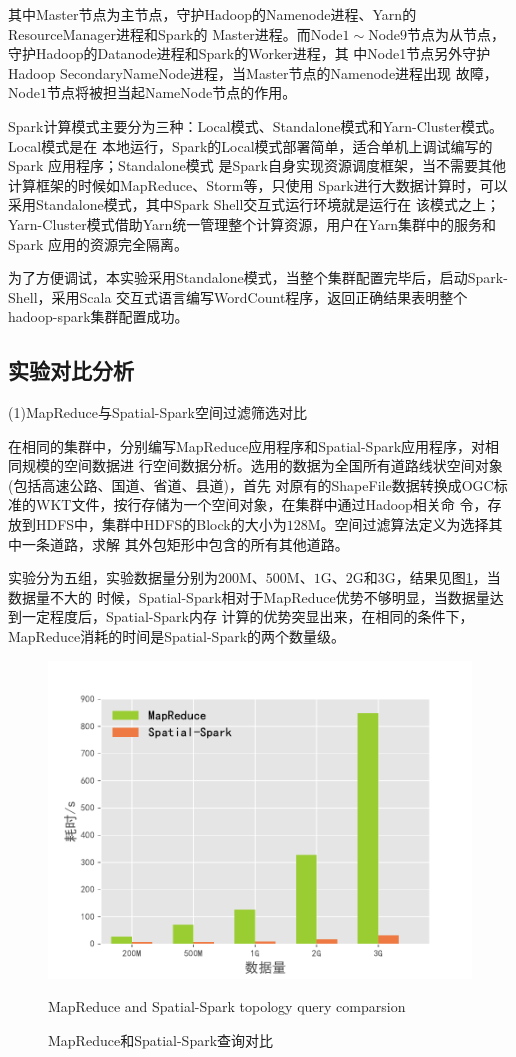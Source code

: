 其中Master节点为主节点，守护Hadoop的Namenode进程、Yarn的ResourceManager进程和Spark的
Master进程。而Node$1\sim $Node$9$节点为从节点，守护Hadoop的Datanode进程和Spark的Worker进程，其
中Node1节点另外守护Hadoop SecondaryNameNode进程，当Master节点的Namenode进程出现
故障，Node$1$节点将被担当起NameNode节点的作用。

Spark计算模式主要分为三种：Local模式、Standalone模式和Yarn-Cluster模式。Local模式是在
本地运行，Spark的Local模式部署简单，适合单机上调试编写的Spark 应用程序；Standalone模式
是Spark自身实现资源调度框架\cite{Fern2016Automated}，当不需要其他计算框架的时候如MapReduce、Storm等，只使用
Spark进行大数据计算时，可以采用Standalone模式，其中Spark Shell交互式运行环境就是运行在
该模式之上；Yarn-Cluster模式借助Yarn统一管理整个计算资源，用户在Yarn集群中的服务和Spark
应用的资源完全隔离。

为了方便调试，本实验采用Standalone模式，当整个集群配置完毕后，启动Spark-Shell，采用Scala
交互式语言编写WordCount程序，返回正确结果表明整个hadoop-spark集群配置成功。
\subsection{实验对比分析}

(1)MapReduce与Spatial-Spark空间过滤筛选对比

在相同的集群中，分别编写MapReduce应用程序和Spatial-Spark应用程序，对相同规模的空间数据进
行空间数据分析。选用的数据为全国所有道路线状空间对象(包括高速公路、国道、省道、县道)，首先
对原有的ShapeFile数据转换成OGC标准的WKT文件，按行存储为一个空间对象，在集群中通过Hadoop相关命
令，存放到HDFS中，集群中HDFS的Block的大小为$128$M。空间过滤算法定义为选择其中一条道路，求解
其外包矩形中包含的所有其他道路。

实验分为五组，实验数据量分别为$200$M、$500$M、$1$G、$2$G和$3$G，结果见图\ref{fig:topycomparsion}，当数据量不大的
时候，Spatial-Spark相对于MapReduce优势不够明显，当数据量达到一定程度后，Spatial-Spark内存
计算的优势突显出来，在相同的条件下，MapReduce消耗的时间是Spatial-Spark的两个数量级。
\begin{figure}
  \centering
  \includegraphics[scale=0.7]{figures/topo_query.pdf} \\
  \caption{MapReduce和Spatial-Spark查询对比}{MapReduce and Spatial-Spark topology query comparsion}
  \label{fig:topycomparsion}
\end{figure}

